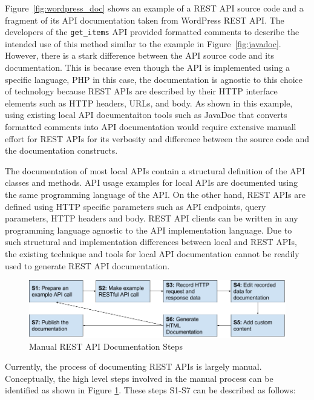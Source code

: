 Figure~\ref{fig:wordpress_doc} shows an example of a REST API source code and a fragment of its API documentation
taken from WordPress REST API. The developers of the \texttt{get\_items} API provided formatted comments to describe the intended use of this method similar to the example
in Figure~\ref{fig:javadoc}. However, there is a stark difference between the API source code and its documentation. This is because even though the API is implemented
using a specific language, PHP in this case, the documentation is agnostic to this choice of technology because REST APIs are described by their HTTP interface elements such as
HTTP headers, URLs, and body. As shown in this example, using existing local API documentaiton tools such as JavaDoc that converts formatted comments into API documentation would require extensive
manuall effort for REST APIs for its verbosity and difference between the source code and the documentation constructs.

The documentation of most local APIs
contain a structural definition of the API classes and methods. API usage examples for local APIs are documented using the same programming language of the API. On the other hand, REST APIs
are defined using HTTP specific parameters such as API endpoints, query parameters, HTTP headers and body. REST API clients can be written in any programming language agnostic to the API
implementation language. Due to such structural and implementation differences between local and REST APIs, the existing technique and tools for local API documentation cannot be readily
used to generate REST API documentation.


\begin{figure}[htb]
  \includegraphics[width=\linewidth]{manual_workflow.png}
  \caption{Manual REST API Documentation Steps}
  \label{fig:manual}
\end{figure}

Currently, the process of documenting REST APIs is largely manual. Conceptually, the high level steps involved in the manual process can be identified as shown in Figure \ref{fig:manual}. These steps S1-S7 can be described as follows:

